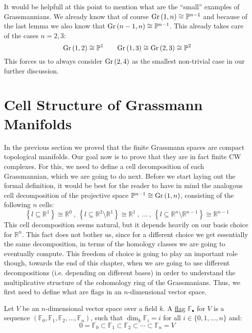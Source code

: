 It would be helpfull at this point to mention what are the ``small'' examples of Grassmannians. We already know that of course $\Gr{1}{n}\cong\mathbb{P}^{n-1}$ and because of the last lemma we also know that $\Gr{n-1}{n}\cong\mathbb{P}^{n-1}$. This already takes care of the cases $n=2,3$:
$$\Gr{1}{2}\cong\mathbb{P}^1\qquad\Gr{1}{3}\cong\Gr{2}{3}\cong\mathbb{P}^2$$
This forces us to always consider $\Gr{2}{4}$ as the smallest non-trivial case in our further discussion.

\section{Cell Structure of Grassmann Manifolds}
In the previous section we proved that the finite Grassmann spaces are compact topological manifolds. Our goal now is to prove that they are in fact finite CW complexes. For this, we need to define a cell decomposition of each Grassmannian, which we are going to do next. Before we start laying out the formal definition, it would be best for the reader to have in mind the analogous cell decomposition of the projective space $\mathbb{P}^{n-1}\cong\Gr{1}{n}$, consisting of the following $n$ cells:
$$\left\{l\subseteq\mathbb{R}^1\right\}\cong\mathbb{R}^0\ ,\ \left\{l\subseteq\mathbb{R}^2\setminus\mathbb{R}^1\right\}\cong\mathbb{R}^1\ ,\ \ldots\ ,\ \left\{l\subseteq\mathbb{R}^n\setminus\mathbb{R}^{n-1}\right\}\cong\mathbb{R}^{n-1}$$
This cell decomposition seems natural, but it depends heavily on our basis choice for $\mathbb{R}^n$. This fact does not bother us, since for a different choice we get essentially the same decomposition, in terms of the homology classes we are going to eventually compute. This freedom of choice is going to play an important role though, towards the end of this chapter, when we are going to use different decompositions (i.e. depending on different bases) in order to understand the multiplicative structure of the cohomology ring of the Grassmanians. Thus, we first need to define what are flags in an $n$-dimensional vector space.

\begin{definition} Let $V$ be an $n$-dimensional vector space over a field $k$. A \ul{flag} $\mathbb{F}_{\bullet}$ for $V$ is a sequence $\left(\mathbb{F}_0,\mathbb{F}_1,\mathbb{F}_2,\ldots,\mathbb{F}_n\right)$, such that $\dim_k\mathbb{F}_i = i$ for all $i\in\{0,1,\ldots,n\}$ and:
$$0=\mathbb{F}_0\subset\mathbb{F}_1\subset\mathbb{F}_2\subset\cdots\subset\mathbb{F}_n=V$$
\end{definition}

